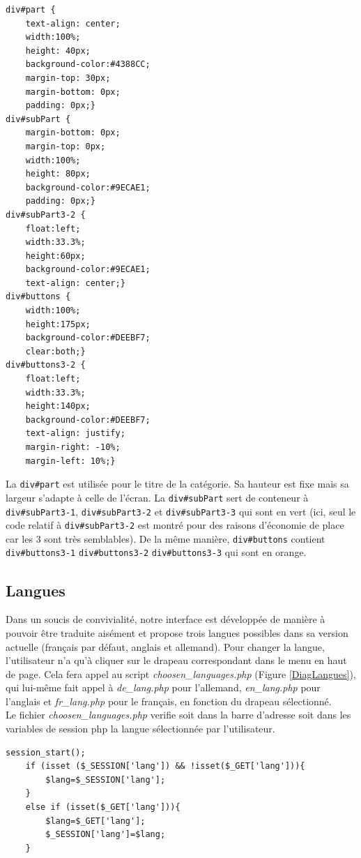 \begin{DDbox}{\linewidth}
\begin{lstlisting}
div#part {
 	text-align: center;
	width:100%;
	height: 40px;
	background-color:#4388CC;
	margin-top: 30px;
	margin-bottom: 0px;
	padding: 0px;}
div#subPart {
	margin-bottom: 0px;
	margin-top: 0px;
	width:100%;
	height: 80px;
	background-color:#9ECAE1;
	padding: 0px;}
div#subPart3-2 {
	float:left;
	width:33.3%;
	height:60px;
	background-color:#9ECAE1;
	text-align: center;}
div#buttons {
	width:100%;
	height:175px;
	background-color:#DEEBF7;
	clear:both;}
div#buttons3-2 {
	float:left;
	width:33.3%;
	height:140px;
	background-color:#DEEBF7;
	text-align: justify;
	margin-right: -10%;
	margin-left: 10%;}
\end{lstlisting}
\end{DDbox}

La \texttt{div\#part} est utilisée pour le titre de la catégorie. Sa hauteur est fixe mais sa largeur s'adapte à celle de l'écran. La \texttt{div\#subPart} sert de conteneur à \texttt{div\#subPart3-1}, \texttt{div\#subPart3-2} et \texttt{div\#subPart3-3}  qui sont en vert (ici, seul le code relatif à \texttt{div\#subPart3-2} est montré pour des raisons d'économie de place car les 3 sont très semblables). De la même manière, \texttt{div\#buttons} contient \texttt{div\#buttons3-1} \texttt{div\#buttons3-2} \texttt{div\#buttons3-3} qui sont en orange. 

\subsection{Langues}
Dans un soucis de convivialité, notre interface est développée de manière à pouvoir être traduite aisément et propose trois langues possibles dans sa version actuelle (français par défaut, anglais et allemand). Pour changer la langue, l'utilisateur n'a qu'à cliquer sur le drapeau correspondant dans le menu en haut de page. Cela fera appel au script \emph{choosen\_languages.php} (Figure \ref{DiagLangues}), qui lui-même fait appel à \emph{de\_lang.php} pour l'allemand, \emph{en\_lang.php} pour l'anglais et \emph{fr\_lang.php} pour le français, en fonction du drapeau sélectionné. \\
Le fichier \emph{choosen\_languages.php} verifie  soit dans la barre d'adresse soit dans les variables de session php la langue sélectionnée par l'utilisateur.\\

\begin{DDbox}{\linewidth}
\begin{lstlisting}
session_start();
	if (isset ($_SESSION['lang']) && !isset($_GET['lang'])){
		$lang=$_SESSION['lang'];
	}
	else if (isset($_GET['lang'])){
		$lang=$_GET['lang'];
		$_SESSION['lang']=$lang;
	}
\end{lstlisting}
\end{DDbox}\\

